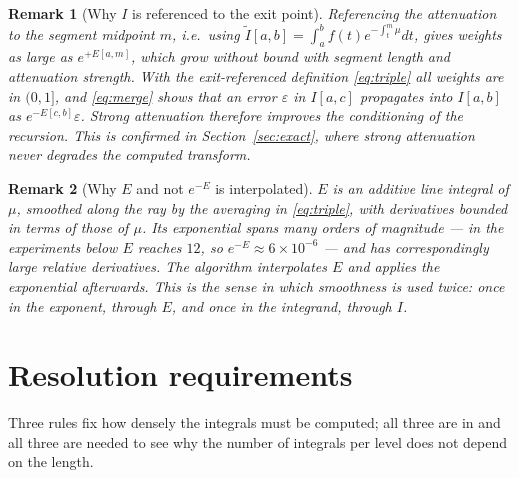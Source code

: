 \documentclass[11pt]{article}
\newtheorem{remark}{Remark}
\begin{document}
\begin{remark}[Why $I$ is referenced to the exit point]
\label{rem:reference}
Referencing the attenuation to the segment midpoint $m$, i.e.\ using
$\tilde I[a,b]=\int_a^b f(t)e^{-\int_t^m\mu}dt$, gives weights as large as
$e^{+E[a,m]}$, which grow without bound with segment length and attenuation
strength. With the exit-referenced definition \eqref{eq:triple} all weights are
in $(0,1]$, and \eqref{eq:merge} shows that an error $\varepsilon$ in $I[a,c]$
propagates into $I[a,b]$ as $e^{-E[c,b]}\varepsilon$. Strong attenuation
therefore improves the conditioning of the recursion. This is confirmed in
Section~\ref{sec:exact}, where strong attenuation never degrades the computed
transform.
\end{remark}

\begin{remark}[Why $E$ and not $e^{-E}$ is interpolated]
\label{rem:exponent}
$E$ is an additive line integral of $\mu$, smoothed along the ray by the
averaging in \eqref{eq:triple}, with derivatives bounded in terms of those of
$\mu$. Its exponential spans many orders of magnitude --- in the experiments
below $E$ reaches $12$, so $e^{-E}\approx 6\times 10^{-6}$ --- and has
correspondingly large relative derivatives. The algorithm interpolates $E$ and
applies the exponential afterwards. This is the sense in which smoothness is
used twice: once in the exponent, through $E$, and once in the integrand,
through $I$.
\end{remark}

\section{Resolution requirements}
\label{sec:sampling}

Three rules fix how densely the integrals must be computed; all three are in
\citep{brandtdym1999} and all three are needed to see why the number of
integrals per level does not depend on the length.
\end{document}
